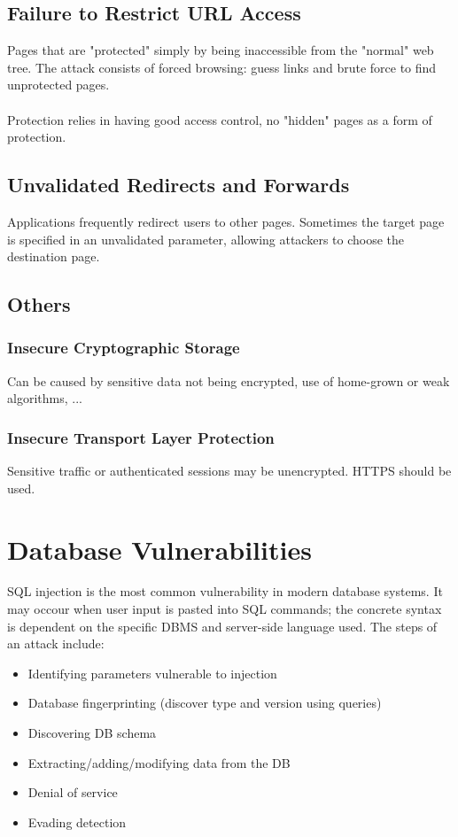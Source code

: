 \documentclass[10pt,a4paper]{report}
\begin{document}
\subsection{Failure to Restrict URL Access}
Pages that are "protected" simply by being inaccessible from the "normal" web tree. The attack consists of forced browsing: guess links and brute force to find unprotected pages.\\
\\
Protection relies in having good access control, no "hidden" pages as a form of protection.
\subsection{Unvalidated Redirects and Forwards}
Applications frequently redirect users to other pages. Sometimes the target page is specified in an unvalidated parameter, allowing attackers to choose the destination page.
\subsection{Others}
\subsubsection{Insecure Cryptographic Storage}
Can be caused by sensitive data not being encrypted, use of home-grown or weak algorithms, ...
\subsubsection{Insecure Transport Layer Protection}
Sensitive traffic or authenticated sessions may be unencrypted. HTTPS should be used.

\section{Database Vulnerabilities}
SQL injection is the most common vulnerability in modern database systems. It may occour when user input is pasted into SQL commands; the concrete syntax is dependent on the specific DBMS and server-side language used. The steps of an attack include:
\begin{itemize}
\item Identifying parameters vulnerable to injection
\item Database fingerprinting (discover type and version using queries)
\item Discovering DB schema
\item Extracting/adding/modifying data from the DB
\item Denial of service
\item Evading detection
\end{itemize}
\end{document}
